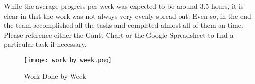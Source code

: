 \documentclass[PPFS.tex]{template/subfiles}
\begin{document}
While the average progress per week was expected to be around 3.5 hours, it is clear in  that the work was not always very evenly spread out. Even so, in the end the team accomplished all the tasks and completed almost all of them on time. Please reference either the Gantt Chart or the Google Spreadsheet to find a particular task if necessary.

\begin{figure}[H]
    \centering
    \texttt{[image: work\_by\_week.png]}
    \caption{Work Done by Week}
    \label{fig:work_by_week}
\end{figure}
\end{document}

